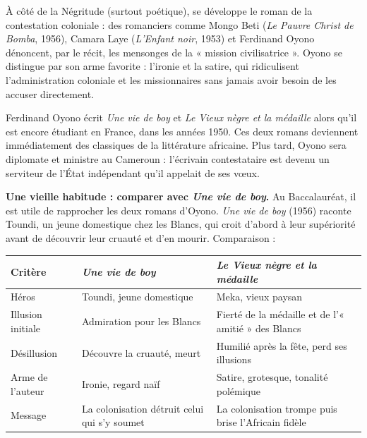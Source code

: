 \documentclass[11pt]{article}
\newcommand{\cle}[1]{{\popxbold\color{popdark}#1}}
\begin{document}
À côté de la Négritude (surtout poétique), se développe le \cle{roman de la contestation coloniale} : des romanciers comme Mongo Beti (\emph{Le Pauvre Christ de Bomba}, 1956), Camara Laye (\emph{L'Enfant noir}, 1953) et Ferdinand Oyono dénoncent, par le récit, les mensonges de la « mission civilisatrice ». Oyono se distingue par son arme favorite : l'\cle{ironie} et la satire, qui ridiculisent l'administration coloniale et les missionnaires sans jamais avoir besoin de les accuser directement.

\begin{savaistu}
Ferdinand Oyono écrit \emph{Une vie de boy} et \emph{Le Vieux nègre et la médaille} alors qu'il est encore étudiant en France, dans les années 1950. Ces deux romans deviennent immédiatement des classiques de la littérature africaine. Plus tard, Oyono sera diplomate et ministre au Cameroun : l'écrivain contestataire est devenu un serviteur de l'État indépendant qu'il appelait de ses vœux.
\end{savaistu}

\textbf{Une vieille habitude : comparer avec \emph{Une vie de boy}.} Au Baccalauréat, il est utile de rapprocher les deux romans d'Oyono. \emph{Une vie de boy} (1956) raconte Toundi, un jeune domestique chez les Blancs, qui croit d'abord à leur supériorité avant de découvrir leur cruauté et d'en mourir. Comparaison :

\begin{center}
\begin{tabularx}{\linewidth}{|l|X|X|}
\hline
\rowcolor{popblueL} \textbf{Critère} & \textbf{\emph{Une vie de boy}} & \textbf{\emph{Le Vieux nègre et la médaille}} \\
\hline
Héros & Toundi, jeune domestique & Meka, vieux paysan \\
\hline
Illusion initiale & Admiration pour les Blancs & Fierté de la médaille et de l'« amitié » des Blancs \\
\hline
Désillusion & Découvre la cruauté, meurt & Humilié après la fête, perd ses illusions \\
\hline
Arme de l'auteur & Ironie, regard naïf & Satire, grotesque, tonalité polémique \\
\hline
Message & La colonisation détruit celui qui s'y soumet & La colonisation trompe puis brise l'Africain fidèle \\
\hline
\end{tabularx}
\end{center}
\end{document}
